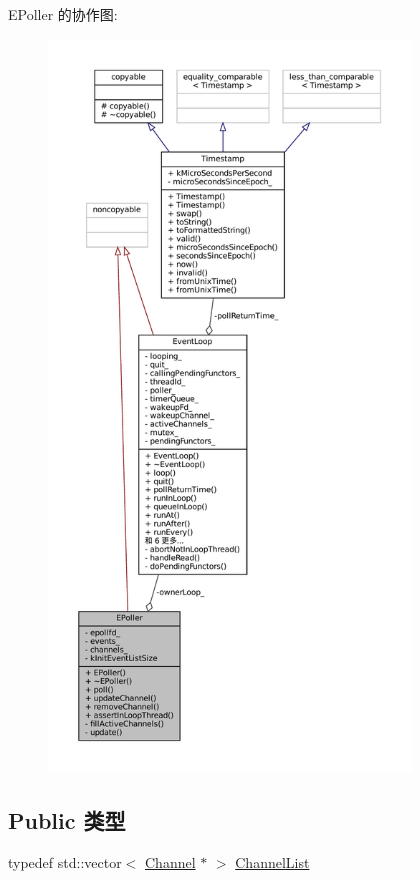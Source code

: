 E\+Poller 的协作图\+:
\nopagebreak
\begin{figure}[H]
\begin{center}
\leavevmode
\includegraphics[height=550pt]{classmuduo_1_1EPoller__coll__graph}
\end{center}
\end{figure}
\subsection*{Public 类型}
\begin{DoxyCompactItemize}
\item 
typedef std\+::vector$<$ \hyperlink{classmuduo_1_1Channel}{Channel} $\ast$ $>$ \hyperlink{classmuduo_1_1EPoller_a0b74248ffee6df294563618187b52404}{Channel\+List}
\end{DoxyCompactItemize}
